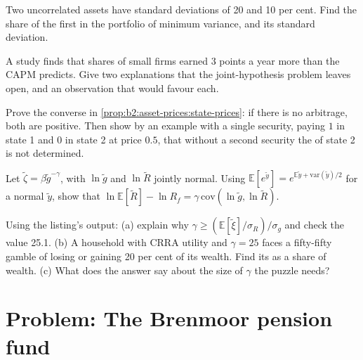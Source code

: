 \begin{exercise}[$\star\star$]\label{exo:b2:asset-prices:8}
Two uncorrelated assets have standard deviations of 20 and 10 per cent. Find the share of the first in
the portfolio of minimum variance, and its standard deviation.
\end{exercise}

\begin{exercise}[$\star\star$]\label{exo:b2:asset-prices:9}
A study finds that shares of small firms earned 3 points a year more than the CAPM predicts. Give two
explanations that the joint-hypothesis problem leaves open, and an observation that would favour each.
\end{exercise}

\begin{exercise}[$\star\star\star$]\label{exo:b2:asset-prices:10}
Prove the converse in \cref{prop:b2:asset-prices:state-prices}: if there is no arbitrage, both  are positive. Then show by an example with a single security, paying $1$ in state 1 and $0$ in
state 2 at price $0.5$, that without a second security the  of state 2 is not determined.
\end{exercise}

\begin{exercise}[$\star\star\star$]\label{exo:b2:asset-prices:11}
Let $\tilde\zeta = \beta\tilde g^{-\gamma}$, with $\ln\tilde g$ and $\ln\tilde R$ jointly normal. Using
$\mathbb{E}[e^{\tilde y}] = e^{\mathbb{E}\tilde y + \mathrm{var}(\tilde y)/2}$ for a normal $\tilde y$,
show that $\ln\mathbb{E}[\tilde R] - \ln R_f = \gamma\,\mathrm{cov}(\ln\tilde g, \ln\tilde R)$.
\end{exercise}

\begin{exercise}[$\star\star\star$]\label{exo:b2:asset-prices:12}
Using the listing's output: (a) explain why $\gamma \ge (\mathbb{E}[\tilde\xi]/\sigma_R)/\sigma_g$ and
check the value 25.1. (b) A household with CRRA utility and $\gamma = 25$ faces a fifty-fifty gamble of
losing or gaining 20 per cent of its wealth. Find its  as a share of wealth. (c) What does
the answer say about the size of $\gamma$ the puzzle needs?
\end{exercise}

\section{Problem: The Brenmoor pension fund}\label{sec:b2:asset-prices:problem}

